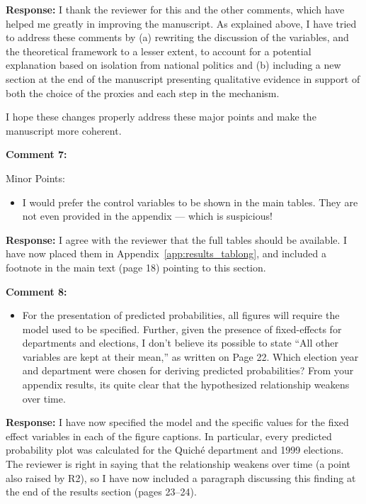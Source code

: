 \documentclass[12pt, a4paper, notitlepage]{article}
\begin{document}
\noindent\textbf{Response:} I thank the reviewer for this and the other comments, which have helped me greatly in improving the manuscript. As explained above, I have tried to address these comments by (a) rewriting the discussion of the variables, and the theoretical framework to a lesser extent, to account for a potential explanation based on isolation from national politics and (b) including a new section at the end of the manuscript presenting qualitative evidence in support of both the choice of the proxies and each step in the mechanism.

I hope these changes properly address these major points and make the manuscript more coherent.

\vspace{15pt}
\noindent\textbf{Comment 7:}
\begin{displayquote}
Minor Points:
\begin{itemize}
\item I would prefer the control variables to be shown in the main tables. They are not even provided in the appendix — which is suspicious!
\end{itemize}
\end{displayquote}

\noindent\textbf{Response:} I agree with the reviewer that the full tables should be available. I have now placed them in Appendix~\ref{app:results_tablong}, and included a footnote in the main text (page 18) pointing to this section.

\vspace{15pt}
\noindent\textbf{Comment 8:}
\begin{displayquote}
\begin{itemize}
\item For the presentation of predicted probabilities, all figures will require the model used to be specified. Further, given the presence of fixed-effects for departments and elections, I don’t believe its possible to state “All other variables are kept at their mean,” as written on Page 22. Which election year and department were chosen for deriving predicted probabilities? From your appendix results, its quite clear that the hypothesized relationship weakens over time.
\end{itemize}
\end{displayquote}

\noindent\textbf{Response:} I have now specified the model and the specific values for the fixed effect variables in each of the figure captions. In particular, every predicted probability plot was calculated for the Quiché department and 1999 elections. The reviewer is right in saying that the relationship weakens over time (a point also raised by R2), so I have now included a paragraph discussing this finding at the end of the results section (pages 23--24).
\end{document}

